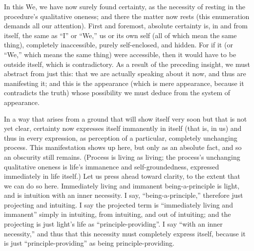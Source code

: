 In this We, we have now surely found certainty,
as the necessity of resting
in the procedure's qualitative oneness;
and there the matter now rests
(this enumeration demands all our attention).
First and foremost, absolute certainty is,
in and from itself,
the same as “I” or “We,”
us or its own self
(all of which mean the same thing),
completely inaccessible,
purely self-enclosed,
and hidden.
For if it
(or “We,” which means the same thing)
were accessible,
then it would have to be outside itself,
which is contradictory.
As a result of the preceding insight,
we must abstract from just this:
that we are actually speaking about it now,
and thus are manifesting it;
and this is the appearance
(which is mere appearance,
because it contradicts the truth)
whose possibility we must deduce
from the system of appearance.

In a way that arises from a ground
that will show itself very soon but
that is not yet clear,
certainty now expresses itself immanently in itself
(that is, in us)
and thus in every expression,
as perception of a particular,
completely unchanging process.
This manifestation shows up here,
but only as an absolute fact,
and so an obscurity still remains.
(Process is living as living;
the process's unchanging qualitative oneness is
life's immanence and self-groundedness,
expressed immediately in life itself.)
Let us press ahead toward clarity,
to the extent that we can do so here.
Immediately living and immanent being-a-principle is light,
and is intuition with an inner necessity.
I say, “being-a-principle,”
therefore just projecting and intuiting.
I say the projected term is “immediately living and immanent”
simply in intuiting, from intuiting, and out of intuiting;
and the projecting is just light's life as “principle-providing”.
I say “with an inner necessity,”
and thus that this necessity must
completely express itself,
because it is just “principle-providing”
as being principle-providing.

